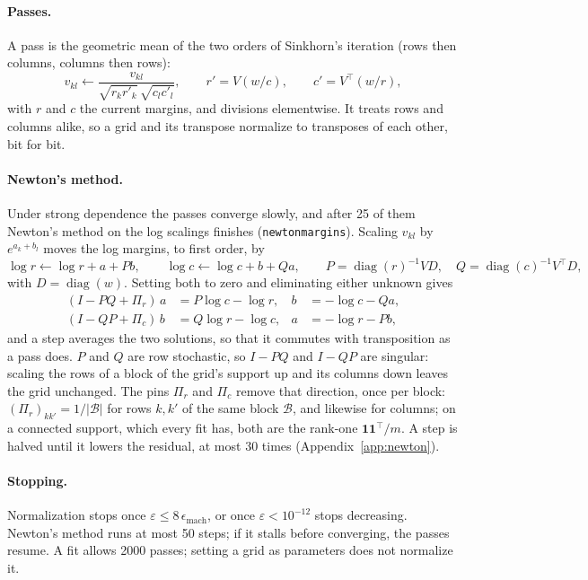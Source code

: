 \documentclass[11pt]{article}
\newcommand{\diag}{\operatorname{diag}}
\newcommand{\codeus}{\textunderscore\allowbreak}
\newcommand{\code}[1]{\begingroup\let\_\codeus\texttt{#1}\endgroup}
\newcommand{\one}{\mathbf{1}}
\begin{document}
\paragraph{Passes.} A pass is the geometric mean of the two orders of
Sinkhorn's iteration (rows then columns, columns then rows):
\[
  v_{kl} \leftarrow \frac{v_{kl}}{\sqrt{r_k r'_k}\, \sqrt{c_l c'_l}}, \qquad
  r' = V (w / c), \qquad c' = V^\top (w / r),
\]
with $r$ and $c$ the current margins, and divisions elementwise. It treats rows
and columns alike, so a grid and its transpose normalize to transposes of each
other, bit for bit.

\paragraph{Newton's method.} Under strong dependence the passes converge
slowly, and after 25 of them Newton's method on the log scalings finishes
(\code{newton\_margins}). Scaling $v_{kl}$ by $e^{a_k + b_l}$ moves the log
margins, to first order, by
\[
  \log r \leftarrow \log r + a + P b, \qquad
  \log c \leftarrow \log c + b + Q a, \qquad
  P = \diag(r)^{-1} V D, \quad Q = \diag(c)^{-1} V^\top D,
\]
with $D = \diag(w)$. Setting both to zero and eliminating either unknown gives
\begin{align*}
  (I - PQ + \Pi_r)\, a &= P \log c - \log r, & b &= -\log c - Q a, \\
  (I - QP + \Pi_c)\, b &= Q \log r - \log c, & a &= -\log r - P b,
\end{align*}
and a step averages the two solutions, so that it commutes with transposition
as a pass does. $P$ and $Q$ are row stochastic, so $I - PQ$ and $I - QP$ are
singular: scaling the rows of a block of the grid's support up and its columns
down leaves the grid unchanged. The pins $\Pi_r$ and $\Pi_c$ remove that
direction, once per block: $(\Pi_r)_{kk'} = 1 / |\mathcal B|$ for rows $k, k'$
of the same block $\mathcal B$, and likewise for columns; on a connected
support, which every fit has, both are the rank-one $\one\one^\top / m$. A step
is halved until it lowers the residual, at most 30 times
(Appendix~\ref{app:newton}).

\paragraph{Stopping.} Normalization stops once
$\varepsilon \leq 8\,\epsilon_{\text{mach}}$, or once $\varepsilon < 10^{-12}$
stops decreasing. Newton's method runs at most 50 steps; if it stalls before
converging, the passes resume. A fit allows 2000 passes; setting a grid as
parameters does not normalize it.
\end{document}
